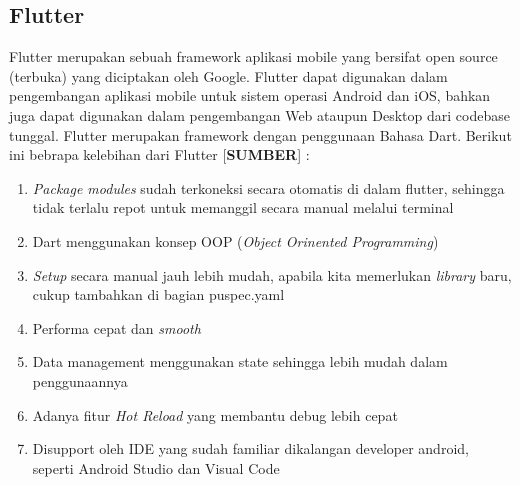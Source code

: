 \begin{flushleft}
\begin{justify}
        \subsection{Flutter}
        Flutter merupakan sebuah framework aplikasi mobile yang bersifat open source (terbuka) yang diciptakan oleh Google. Flutter dapat digunakan dalam pengembangan aplikasi mobile untuk sistem operasi Android dan iOS, bahkan juga dapat digunakan dalam pengembangan Web ataupun Desktop dari codebase tunggal. Flutter merupakan framework dengan penggunaan Bahasa Dart.
Berikut ini bebrapa kelebihan dari Flutter [\textbf{SUMBER}] :
\begin{enumerate}
    \item \textit{Package modules} sudah terkoneksi secara otomatis di dalam flutter, sehingga tidak terlalu repot untuk memanggil secara manual melalui terminal
    \item Dart menggunakan konsep OOP (\textit{Object Orinented Programming})
    \item \textit{Setup} secara manual jauh lebih mudah, apabila kita memerlukan \textit{library} baru, cukup tambahkan di bagian puspec.yaml
    \item Performa cepat dan  \textit{smooth}
    \item Data management menggunakan state sehingga lebih mudah dalam penggunaannya
    \item Adanya fitur \textit{Hot Reload} yang membantu debug lebih cepat
    \item Disupport oleh IDE yang sudah familiar dikalangan developer android, seperti Android Studio dan Visual Code\\
    
\end{enumerate}



\end{justify}
\end{flushleft}
